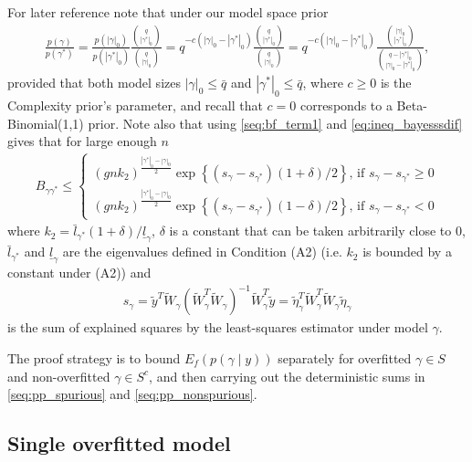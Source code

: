 For later reference note that under our model space prior
\begin{align}
 \frac{p(\gamma)}{p(\gamma^*)}= \frac{p(|\gamma|_0)}{p(|\gamma^*|_0)} \frac{{q \choose |\gamma^*|_0}}{{q \choose |\gamma|_0}}
= q^{-c(|\gamma|_0 - |\gamma^*|_0)} \frac{{q \choose |\gamma^*|_0}}{{q \choose |\gamma|_0}}
= q^{-c(|\gamma|_0 - |\gamma^*|_0)} \frac{{|\gamma|_0 \choose |\gamma^*|_0 }}{{q - |\gamma^*|_0 \choose |\gamma|_0 - |\gamma^*|_0}},
\label{seq:ratio_priormodelprob}
\end{align}
provided that both model sizes $|\gamma|_0 \leq \bar{q}$ and $|\gamma^*|_0 \leq \bar{q}$,
where $c \geq 0$ is the Complexity prior's parameter, and recall that $c=0$ corresponds to a Beta-Binomial(1,1) prior.
Note also that using \eqref{seq:bf_term1} and \eqref{eq:ineq_bayesssdif} gives that for large enough $n$
\begin{align}
 B_{\gamma \gamma^*} \leq
\begin{cases}
 (g n k_2)^{\frac{|\gamma^*|_0 - |\gamma|_0}{2}} \exp \left\{ (s_\gamma - s_{\gamma^*})(1 + \delta)/2 \right\} \mbox{, if } s_\gamma - s_{\gamma^*} \geq 0
\\
 (g n k_2)^{\frac{|\gamma^*|_0 - |\gamma|_0}{2}} \exp \left\{ (s_\gamma - s_{\gamma^*})(1 - \delta)/2 \right\} \mbox{, if } s_\gamma - s_{\gamma^*} <0
\end{cases}
\nonumber
\end{align}
where $k_2= \bar{l}_{\gamma^*}(1 + \delta) / \underline{l}_\gamma$, $\delta$ is a constant that can be taken arbitrarily close to 0, 
$\bar{l}_{\gamma^*}$ and $\underline{l}_\gamma$ are the eigenvalues defined in Condition (A2) (i.e. $k_2$ is bounded by a constant under (A2))
and \begin{align}
 s_\gamma= \tilde{y}^T \widetilde{W}_\gamma (\widetilde{W}_\gamma^T \widetilde{W}_\gamma)^{-1} \widetilde{W}_\gamma^T \tilde{y}=
\tilde{\eta}_\gamma^T \widetilde{W}_\gamma^T \widetilde{W}_\gamma \tilde{\eta}_\gamma
\nonumber
\end{align}
is the sum of explained squares by the least-squares estimator under model $\gamma$.

The proof strategy is to bound $E_f ( p(\gamma \mid y) )$ separately for overfitted $\gamma \in S$ and non-overfitted $\gamma \in S^c$, and then carrying out the deterministic sums in \eqref{seq:pp_spurious} and \eqref{seq:pp_nonspurious}.


\subsection{Single overfitted model}

